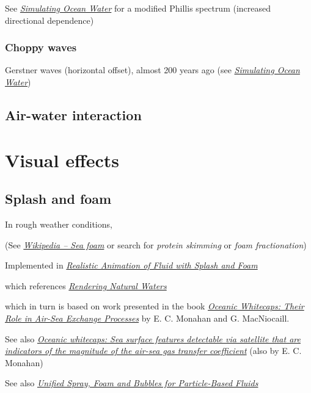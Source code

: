 See \textit{\href{http://graphics.ucsd.edu/courses/rendering/2005/jdewall/tessendorf.pdf}{Simulating Ocean Water}} for a modified Phillis spectrum (increased directional dependence)

\subsubsection{Choppy waves}

Gerstner waves (horizontal offset), almost 200 years ago (see \textit{\href{http://graphics.ucsd.edu/courses/rendering/2005/jdewall/tessendorf.pdf}{Simulating Ocean Water}})

\subsection{Air-water interaction}

\section{Visual effects}

\subsection{Splash and foam}

In rough weather conditions, 

(See \textit{\href{http://en.wikipedia.org/wiki/Sea_foam}{Wikipedia -- Sea foam}} or search for \textit{protein skimming} or \textit{foam fractionation})

Implemented in \textit{\href{http://nguyendangbinh.org/Proceedings/Eurographics/2003/cgf/volume22/issue3/paper127/paper127.pdf}{Realistic Animation of Fluid with Splash and Foam}}

which references \textit{\href{http://citeseerx.ist.psu.edu/viewdoc/download?doi=10.1.1.4.6262&rep=rep1&type=pdf}{Rendering Natural Waters}}

which in turn is based on work presented in the book \textit{\href{http://books.google.se/books?id=xuwFz1bPTHgC}{Oceanic Whitecaps: Their Role in Air-Sea Exchange Processes}} by E. C. Monahan and G. MacNiocaill.

See also \textit{\href{http://www.ias.ac.in/jess/sep2002/Ps18.pdf}{Oceanic whitecaps: Sea surface features detectable via satellite that are indicators of the magnitude of the air-sea gas transfer coefficient}} (also by  E. C. Monahan)

See also \textit{\href{http://cg.informatik.uni-freiburg.de/publications/2012_CGI_sprayFoamBubbles.pdf}{Unified Spray, Foam and Bubbles for Particle-Based Fluids}}

